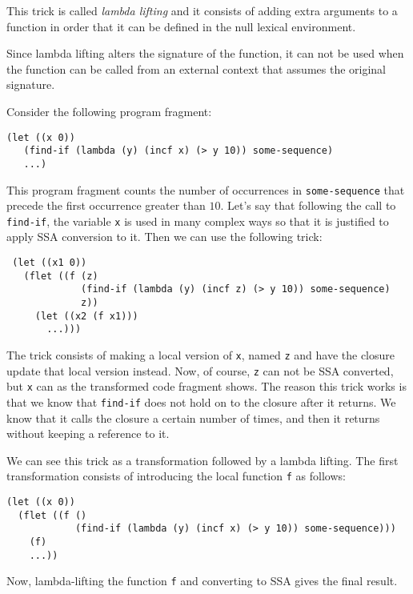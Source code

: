This trick is called \emph{lambda lifting} and it consists of adding
extra arguments to a function in order that it can be defined in the
null lexical environment.  

Since lambda lifting alters the signature of the function, it can not
be used when the function can be called from an external context that
assumes the original signature. 

Consider the following program fragment:

\begin{verbatim}
(let ((x 0))
   (find-if (lambda (y) (incf x) (> y 10)) some-sequence)
   ...)
\end{verbatim}

This program fragment counts the number of occurrences in
\texttt{some-sequence} that precede the first occurrence greater than
$10$.  Let's say that following the call to \texttt{find-if}, the
variable \texttt{x} is used in many complex ways so that it is
justified to apply SSA conversion to it.  Then we can use the
following trick:

\begin{verbatim}
 (let ((x1 0))
   (flet ((f (z)
             (find-if (lambda (y) (incf z) (> y 10)) some-sequence)
             z))
     (let ((x2 (f x1)))
       ...)))
\end{verbatim}

The trick consists of making a local version of \texttt{x}, named
\texttt{z} and have the closure update that local version instead.
Now, of course, \texttt{z} can not be SSA converted, but \texttt{x}
can as the transformed code fragment shows.  The reason this trick
works is that we know that \texttt{find-if} does not hold on to the
closure after it returns.  We know that it calls the closure a certain
number of times, and then it returns without keeping a reference to
it.%

We can see this trick as a transformation followed by a lambda
lifting.  The first transformation consists of introducing the local
function \texttt{f} as follows:

\begin{verbatim}
(let ((x 0))
  (flet ((f ()
            (find-if (lambda (y) (incf x) (> y 10)) some-sequence)))
    (f)
    ...)) 
\end{verbatim}

Now, lambda-lifting the function \texttt{f} and converting to SSA
gives the final result. 

